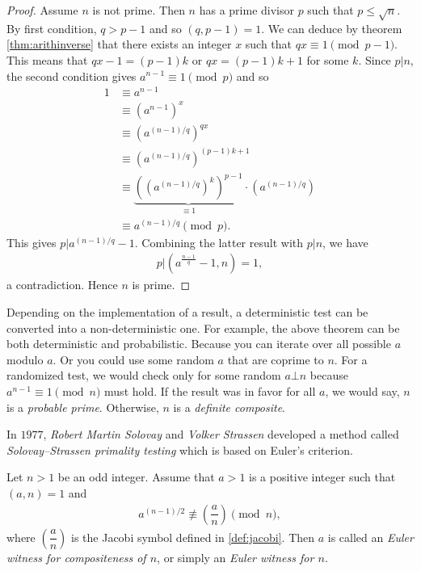 \documentclass{subfiles}
\begin{document}
		\begin{proof}
			Assume $n$ is not prime. Then $n$ has a prime divisor $p$ such that $p \leq \sqrt n$. By first condition, $q>p-1$ and so $(q, p-1)=1$. We can deduce by theorem \eqref{thm:arithinverse} that there exists an integer $x$ such that $qx \equiv 1 \pmod {p-1}$. This means that $qx-1 = (p-1)k$ or $qx = (p-1)k+1$ for some $k$. Since $p|n$, the second condition gives $a^{n-1} \equiv 1 \pmod p$ and so
				\begin{align*}
					1 & \equiv a^{n-1} \\
					  & \equiv \left(a^{n-1}\right)^{x}\\
					  & \equiv \left(a^{(n-1)/q}\right)^{qx}\\
					  & \equiv \left(a^{(n-1)/q}\right)^{(p-1)k+1}\\
					  & \equiv \underbrace{\left(\left(a^{(n-1)/q}\right)^{k}\right)^{p-1}}_{\equiv 1} \cdot \left(a^{(n-1)/q}\right)\\
					  & \equiv a^{(n-1)/q} \pmod p.
				\end{align*}
			This gives $p|a^{(n-1)/q}-1$. Combining the latter result with $p|n$, we have
				\begin{align*}
					p\big|\left(a^{\frac{n-1}{q}}-1,n\right)=1,
				\end{align*}
			a contradiction. Hence $n$ is prime.
		\end{proof}
	
		\begin{note}
			Depending on the implementation of a result, a deterministic test can be converted into a non-deterministic one. For example, the above theorem can be both deterministic and probabilistic. Because you can iterate over all possible $a$ modulo $a$. Or you could use some random $a$ that are coprime to $n$. For a randomized test, we would check only for some random $a\bot n$ because $a^{n-1}\equiv1\pmod n$ must hold. If the result was in favor for all $a$, we would say, $n$ is a \textit{probable prime}. Otherwise, $n$ is a \textit{definite composite}.
		\end{note}
	In $1977$, \textit{Robert Martin Solovay} and \textit{Volker Strassen} developed a method called \textit{Solovay--Strassen primality testing} which is based on Euler's criterion. 
		
		\begin{definition}
			Let $n>1$ be an odd integer. Assume that $a>1$ is a positive integer such that $(a,n)=1$ and 
				\begin{align*}
					a^{(n-1)/2} \not \equiv \left(\dfrac{a}{n}\right) \pmod n,
				\end{align*}
			where $\left(\dfrac{a}{n}\right)$ is the Jacobi symbol defined in \eqref{def:jacobi}. Then $a$ is called an \textit{Euler witness for compositeness of $n$}, or simply an \textit{Euler witness for $n$.}
		\end{definition}
		
\end{document}
